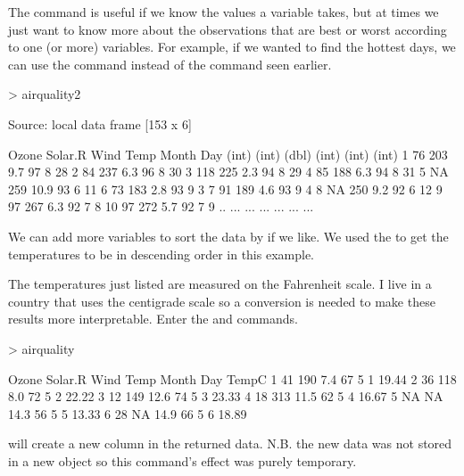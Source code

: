The  command is useful if we know the values a variable takes, but at times we just want to know more about the observations that are best or worst according to one (or more) variables. For example, if we wanted to find the hottest days, we can use the  command instead of the  command seen earlier.
\begin{Schunk}
\begin{Sinput}
> airquality2 %>% arrange(desc(Temp))
\end{Sinput}
\begin{Soutput}
Source: local data frame [153 x 6]

   Ozone Solar.R  Wind  Temp Month   Day
   (int)   (int) (dbl) (int) (int) (int)
1     76     203   9.7    97     8    28
2     84     237   6.3    96     8    30
3    118     225   2.3    94     8    29
4     85     188   6.3    94     8    31
5     NA     259  10.9    93     6    11
6     73     183   2.8    93     9     3
7     91     189   4.6    93     9     4
8     NA     250   9.2    92     6    12
9     97     267   6.3    92     7     8
10    97     272   5.7    92     7     9
..   ...     ...   ...   ...   ...   ...
\end{Soutput}
\end{Schunk}
We can add more variables to sort the data by if we like. We used the  to get the temperatures to be in descending order in this example.

The temperatures just listed are measured on the Fahrenheit scale. I live in a country that uses the centigrade scale so a conversion is needed to make these results more interpretable. Enter the  and 
 commands. 

\begin{Schunk}
\begin{Sinput}
> airquality %>% mutate(TempC = (Temp - 32) * 5 / 9) %>% head()
\end{Sinput}
\begin{Soutput}
  Ozone Solar.R Wind Temp Month Day TempC
1    41     190  7.4   67     5   1 19.44
2    36     118  8.0   72     5   2 22.22
3    12     149 12.6   74     5   3 23.33
4    18     313 11.5   62     5   4 16.67
5    NA      NA 14.3   56     5   5 13.33
6    28      NA 14.9   66     5   6 18.89
\end{Soutput}
\end{Schunk}
will create a new column in the returned data. N.B. the new data was not stored in a new object so this command's effect was purely temporary.


